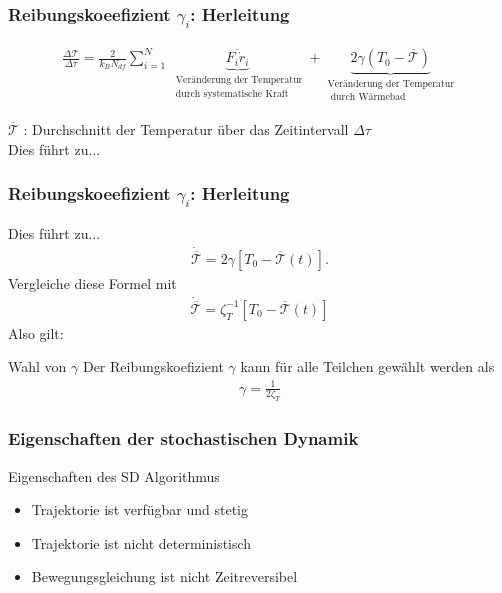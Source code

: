 \documentclass{beamer}
\begin{document}
\begin{frame}
	\frametitle{Reibungskoeefizient $\gamma_i$: Herleitung}
	\begin{align*}
		\frac{\Delta \mathcal{T}}{\Delta \tau} = \frac{2}{k_B N_{df}} \sum\limits_{i=1}^N  \underbrace{\overline{F_i \dot{r}_i} }_ {\substack{\text{ Veränderung der Temperatur} \\ \text{ durch systematische Kraft}} }+\underbrace{ 2 \gamma (T_0 - \overline{\mathcal{T}})  }_{\substack{\text{Veränderung der Temperatur} \\ \text{ durch Wärmebad}}}
	\end{align*} 	
	
	$\overline{\mathcal{T}}$ : Durchschnitt der Temperatur über das Zeitintervall $\Delta \tau$\\
	Dies führt zu...
\end{frame}

\begin{frame} 
	\frametitle{Reibungskoeefizient $\gamma_i$: Herleitung} 
	
	Dies führt zu...
	\begin{align*}
		\dot{ \overline{\mathcal{T}} } = 2 \gamma [T_0 - \overline{\mathcal{T}}(t)]  .
	\end{align*}
	Vergleiche diese Formel mit 
	\begin{align*}
	\dot{ \overline{\mathcal{T}} } = \zeta_T^{-1} [T_0 - \overline{\mathcal{T}}(t)] 
	\end{align*}
	Also gilt:
	\begin{block}{Wahl von $\gamma$}
		Der Reibungskoefizient $\gamma$ kann für alle Teilchen gewählt werden als 
		\begin{align*}
			\gamma = \frac{1}{2 \zeta_T}
		\end{align*}
	\end{block}
\end{frame}


\begin{frame} 
	\frametitle{Eigenschaften der stochastischen Dynamik} 
	\begin{block}{Eigenschaften des SD Algorithmus}
		\begin{itemize}
			\item Trajektorie ist verfügbar und stetig
			\item  Trajektorie ist nicht deterministisch
			\item Bewegungsgleichung ist nicht Zeitreversibel
		\end{itemize}
	\end{block}
\end{frame}
	
\end{document}
